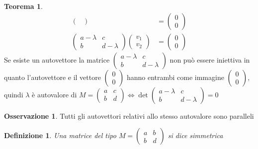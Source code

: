 \documentclass[10pt,a4paper]{article}
\theoremstyle{plain}
\newtheorem{definizione}[subsection]{Definizione}
\theoremstyle{definition}
\newtheorem{teorema}[subsection]{Teorema}
\newtheorem{osservazione}[subsection]{Osservazione}
\begin{document}
\begin{teorema}
\begin{align*}
\begin{pmatrix}
	\end{pmatrix}
	&=
	\begin{pmatrix}
		0  \\ 0
	\end{pmatrix}
	\\
	\begin{pmatrix}
		a-\lambda & c \\ b & d-\lambda
	\end{pmatrix}
	\begin{pmatrix}
		v_1 \\ v_2
	\end{pmatrix}
	&=
	\begin{pmatrix}
		0 \\ 0
	\end{pmatrix}
\end{align*}
Se esiste un autovettore la matrice $\begin{pmatrix}
a-\lambda & c \\ b & d-\lambda
\end{pmatrix}$ non può essere iniettiva in quanto l'autovettore e il vettore $\begin{pmatrix}
	0 \\ 0
\end{pmatrix}$ hanno entrambi come immagine $\begin{pmatrix}
	0 \\ 0
\end{pmatrix}$, quindi $\lambda$ è autovalore di $M = \begin{pmatrix}
	a & c \\ b & d
\end{pmatrix} \Leftrightarrow \det{\begin{pmatrix}
	a-\lambda & c \\ b & d-\lambda
\end{pmatrix}}=0$ 
\end{teorema}
\begin{osservazione}
	Tutti gli autovettori relativi allo stesso autovalore sono paralleli
\end{osservazione}
\begin{definizione}
	Una matrice del tipo $M=\begin{pmatrix}
		a & b \\ b & d
	\end{pmatrix}$ si dice simmetrica
\end{definizione}
\end{document}
